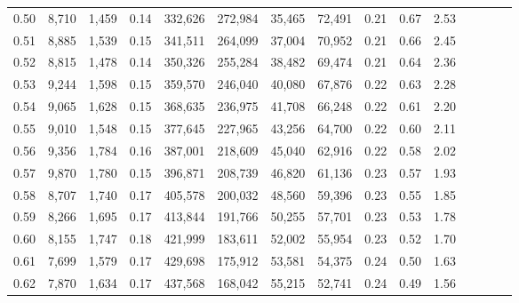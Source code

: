\begin{tabular}{rrrcrrrrrrrrrrr}
0.50 &   8,710 &  1,459 &                                       0.14 &  332,626 &  272,984 &   35,465 &   72,491 &  0.21 &  0.67 &                         2.53 \\
0.51 &   8,885 &  1,539 &                                       0.15 &  341,511 &  264,099 &   37,004 &   70,952 &  0.21 &  0.66 &                         2.45 \\
0.52 &   8,815 &  1,478 &                                       0.14 &  350,326 &  255,284 &   38,482 &   69,474 &  0.21 &  0.64 &                         2.36 \\
0.53 &   9,244 &  1,598 &                                       0.15 &  359,570 &  246,040 &   40,080 &   67,876 &  0.22 &  0.63 &                         2.28 \\
0.54 &   9,065 &  1,628 &                                       0.15 &  368,635 &  236,975 &   41,708 &   66,248 &  0.22 &  0.61 &                         2.20 \\
0.55 &   9,010 &  1,548 &                                       0.15 &  377,645 &  227,965 &   43,256 &   64,700 &  0.22 &  0.60 &                         2.11 \\
0.56 &   9,356 &  1,784 &                                       0.16 &  387,001 &  218,609 &   45,040 &   62,916 &  0.22 &  0.58 &                         2.02 \\
0.57 &   9,870 &  1,780 &                                       0.15 &  396,871 &  208,739 &   46,820 &   61,136 &  0.23 &  0.57 &                         1.93 \\
0.58 &   8,707 &  1,740 &                                       0.17 &  405,578 &  200,032 &   48,560 &   59,396 &  0.23 &  0.55 &                         1.85 \\
0.59 &   8,266 &  1,695 &                                       0.17 &  413,844 &  191,766 &   50,255 &   57,701 &  0.23 &  0.53 &                         1.78 \\
0.60 &   8,155 &  1,747 &                                       0.18 &  421,999 &  183,611 &   52,002 &   55,954 &  0.23 &  0.52 &                         1.70 \\
0.61 &   7,699 &  1,579 &                                       0.17 &  429,698 &  175,912 &   53,581 &   54,375 &  0.24 &  0.50 &                         1.63 \\
0.62 &   7,870 &  1,634 &                                       0.17 &  437,568 &  168,042 &   55,215 &   52,741 &  0.24 &  0.49 &                         1.56 \\

\end{tabular}
